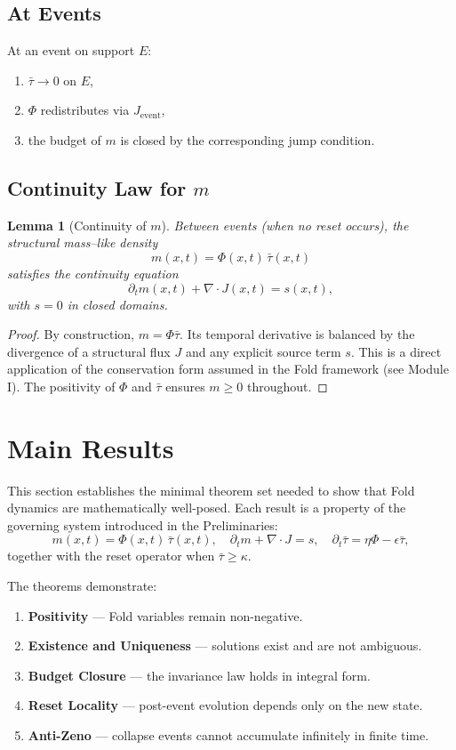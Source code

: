 \documentclass[11pt]{article}
\newtheorem{lemma}[theorem]{Lemma}
\begin{document}
\subsection{At Events}
At an event on support $E$:
\begin{enumerate}[leftmargin=*]
    \item $\bar{\tau} \to 0$ on $E$,
    \item $\Phi$ redistributes via $J_{\text{event}}$,
    \item the budget of $m$ is closed by the corresponding jump condition.
\end{enumerate}

\subsection{Continuity Law for $m$}

\begin{lemma}[Continuity of $m$]\label{lem:continuity}
Between events (when no reset occurs), the structural mass--like density
\[
m(x,t) = \Phi(x,t)\,\bar{\tau}(x,t)
\]
satisfies the continuity equation
\[
\partial_t m(x,t) + \nabla \cdot J(x,t) = s(x,t),
\]
with $s=0$ in closed domains.
\end{lemma}

\begin{proof}
By construction, $m = \Phi \bar{\tau}$. Its temporal derivative is balanced by the divergence of a structural flux $J$ and any explicit source term $s$. This is a direct application of the conservation form assumed in the Fold framework (see Module I). The positivity of $\Phi$ and $\bar{\tau}$ ensures $m \geq 0$ throughout. \qedhere
\end{proof}


\section{Main Results}

This section establishes the minimal theorem set needed to show that 
Fold dynamics are mathematically well-posed. Each result is a property 
of the governing system introduced in the Preliminaries:
\[
m(x,t) = \Phi(x,t)\,\bar{\tau}(x,t), \quad
\partial_t m + \nabla \cdot J = s, \quad
\partial_t \bar{\tau} = \eta \Phi - \epsilon \bar{\tau},
\]
together with the reset operator when $\bar{\tau} \geq \kappa$. 

The theorems demonstrate:
\begin{enumerate}[leftmargin=*]
    \item \textbf{Positivity} — Fold variables remain non-negative.
    \item \textbf{Existence and Uniqueness} — solutions exist and are not ambiguous.
    \item \textbf{Budget Closure} — the invariance law holds in integral form.
    \item \textbf{Reset Locality} — post-event evolution depends only on the new state.
    \item \textbf{Anti-Zeno} — collapse events cannot accumulate infinitely in finite time.
\end{enumerate}
\end{document}

